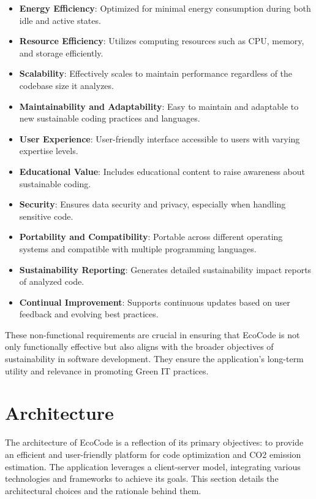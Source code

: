 \documentclass[conference,compsoc]{IEEEtran}
\begin{document}
\begin{itemize}
    \item \textbf{Energy Efficiency}: Optimized for minimal energy consumption during both idle and active states.
    \item \textbf{Resource Efficiency}: Utilizes computing resources such as CPU, memory, and storage efficiently.
    \item \textbf{Scalability}: Effectively scales to maintain performance regardless of the codebase size it analyzes.
    \item \textbf{Maintainability and Adaptability}: Easy to maintain and adaptable to new sustainable coding practices and languages.
    \item \textbf{User Experience}: User-friendly interface accessible to users with varying expertise levels.
    \item \textbf{Educational Value}: Includes educational content to raise awareness about sustainable coding.
    \item \textbf{Security}: Ensures data security and privacy, especially when handling sensitive code.
    \item \textbf{Portability and Compatibility}: Portable across different operating systems and compatible with multiple programming languages.
    \item \textbf{Sustainability Reporting}: Generates detailed sustainability impact reports of analyzed code.
    \item \textbf{Continual Improvement}: Supports continuous updates based on user feedback and evolving best practices.
\end{itemize}

These non-functional requirements are crucial in ensuring that EcoCode is not only functionally effective but also aligns with the broader objectives of sustainability in software development. They ensure the application's long-term utility and relevance in promoting Green IT practices.

\section{Architecture}
The architecture of EcoCode is a reflection of its primary objectives: to provide an efficient and user-friendly platform for  code optimization and CO2 emission estimation. The application leverages a client-server model, integrating various technologies and frameworks to achieve its goals. This section details the architectural choices and the rationale behind them.
\end{document}

